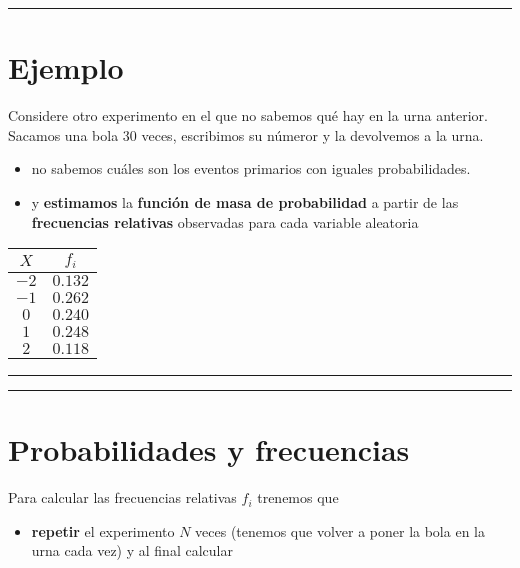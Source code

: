 \documentclass[
]{book}
\providecommand{\tightlist}{%
  \setlength{\itemsep}{0pt}\setlength{\parskip}{0pt}}
\begin{document}
\begin{center}\rule{0.5\linewidth}{0.5pt}\end{center}

\hypertarget{ejemplo-7}{%
\section{Ejemplo}\label{ejemplo-7}}

Considere otro experimento en el que no sabemos qué hay en la urna anterior. Sacamos una bola \(30\) veces, escribimos su númeror y la devolvemos a la urna.

\begin{itemize}
\item
  no sabemos cuáles son los eventos primarios con iguales probabilidades.
\item
  y \textbf{estimamos} la \textbf{función de masa de probabilidad} a partir de las \textbf{frecuencias relativas} observadas para cada variable aleatoria
\end{itemize}

\begin{longtable}[]{@{}cc@{}}
\toprule
\(X\) & \(f_i\) \\
\midrule
\endhead
\(-2\) & \(0.132\) \\
\(-1\) & \(0.262\) \\
\(0\) & \(0.240\) \\
\(1\) & \(0.248\) \\
\(2\) & \(0.118\) \\
\bottomrule
\end{longtable}

\begin{center}\rule{0.5\linewidth}{0.5pt}\end{center}

\begin{center}\rule{0.5\linewidth}{0.5pt}\end{center}

\hypertarget{probabilidades-y-frecuencias}{%
\section{Probabilidades y frecuencias}\label{probabilidades-y-frecuencias}}

Para calcular las frecuencias relativas \(f_i\) trenemos que

\begin{itemize}
\tightlist
\item
  \textbf{repetir} el experimento \(N\) veces (tenemos que volver a poner la bola en la urna cada vez) y al final calcular
\end{itemize}
\end{document}
